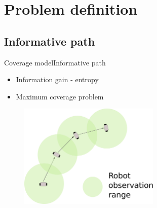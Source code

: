 \section{Problem definition}

\subsection{Informative path}

\begin{frame}{Coverage model}{Informative path}

\begin{itemize}
\item Information gain - entropy 
\item Maximum coverage problem
\end{itemize}

\begin{figure}
\centering
\includegraphics[width = 0.6\textwidth]{./figure/robotObservation}
\end{figure}

\end{frame}


